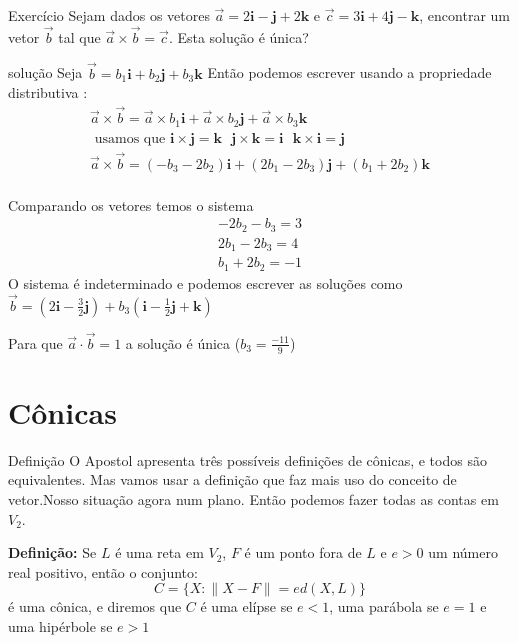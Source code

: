 \documentclass{beamer}
\begin{document}
\begin{frame}{Exercício}
  Sejam dados os vetores $\vec{a}=2\mathbf{i}-\mathbf{j}+2\mathbf{k}$ e 
  $\vec{c}=3\mathbf{i} +4\mathbf{j} -\mathbf{k}$, encontrar um vetor $\vec{b}$ tal que
  $\vec{a}\times \vec{b}=\vec{c}.$ Esta solução é única?
\end{frame}

\begin{frame}{solução}
Seja $\vec{b}=b_1\mathbf{i}+b_2\mathbf{j} + b_3\mathbf{k}$
Então podemos escrever usando a propriedade distributiva :
\begin{gather*}
  \vec{a}\times \vec{b}=\vec{a}\times b_1\mathbf{i} + \vec{a}\times b_2\mathbf{j} + 
  \vec{a}\times b_3\mathbf{k}\\
  \text{ usamos que } \mathbf{i}\times\mathbf{j} = \mathbf{k}\text{ } \mathbf{j}\times\mathbf{k} = \mathbf{i}\text{ }
  \mathbf{k}\times\mathbf{i} = \mathbf{j}\\
  \vec{a}\times \vec{b} = (-b_3-2b_2)\mathbf{i} + (2b_1-2b_3)\mathbf{j} +(b_1 +2b_2)\mathbf{k} \\
\end{gather*}
\end{frame}

\begin{frame}
  Comparando os vetores temos o sistema
  \begin{gather*}
    -2b_2 - b_3 = 3 \\
    2b_1 - 2b_3 = 4 \\
    b_1 + 2b_2 = -1
  \end{gather*}
  O sistema é indeterminado e podemos escrever as soluções
  como $\vec{b}= (2\mathbf{i} - \frac{3}{2}\mathbf{j}) + b_3(\mathbf{i}-\frac{1}{2}\mathbf{j}
  +\mathbf{k})$

  Para que $\vec{a}\cdot \vec{b}=1$ a solução é única ($b_3=\frac{-11}{9}$)

  
\end{frame}

\section{Cônicas}

\begin{frame}{Definição}
  O Apostol apresenta três possíveis definições de cônicas, e todos são equivalentes.
  Mas vamos usar a definição que faz mais uso do conceito de vetor.Nosso situação agora 
  num plano. Então podemos fazer todas as contas em $V_2$.

  \textbf{Definição:} Se $L$ é uma reta em $V_2$, $F$ é um ponto fora de $L$ e $e>0$ um 
  número real positivo, então o conjunto:
  $$ C=\{X : \|X-F\| = e d(X,L)    \}$$ é uma cônica, e diremos que $C$ é uma elípse se 
  $e<1$, uma parábola se $e=1$ e uma hipérbole se $e>1$

\end{frame}
\end{document}
